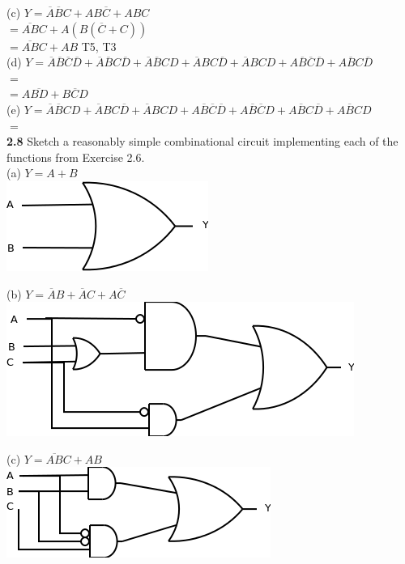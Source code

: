 \documentclass[12pt,a4paper]{report}
\newcommand*{\al}{\overline{A}}
\newcommand*{\cl}{\overline{C}}
\begin{document}
\begin{normalsize}
(c) $ Y = \overline{A}\overline{B}C + AB\overline{C} + ABC $ \\
$ = \overline{AB}C + A(B(\cl{}+C)) $ \\ 
$ = \overline{AB}C + AB $ T5, T3 \\

(d) $ Y = \overline{A}\overline{B}\overline{C}\overline{D} + \overline{A}\overline{B}C\overline{D} + \overline{A}\overline{B}CD + \overline{A}BC\overline{D} + \overline{A}BCD + A\overline{B}\overline{C}\overline{D} + A\overline{B}C\overline{D} $ \\
$ = $ \\

$ = A\overline{BD} + \overline{BCD} $ \\

(e) $ Y = \overline{A}\overline{B}CD + \overline{A}BC\overline{D} + \overline{A}BCD + A\overline{B}\overline{C}\overline{D} + A\overline{B}\overline{C}D + A\overline{B}C\overline{D} + A\overline{B}CD $ \\
$ = $ \\


\textbf{2.8} Sketch a reasonably simple combinational circuit implementing each of the functions from Exercise 2.6. \\
(a) $ Y = A + B $ \\
\includegraphics[scale=1]{2_8A}

(b) $ Y = \al{}B + \al{}C + A\cl{} $ \\
\includegraphics[scale=1]{2_8B}

(c) $ Y = \overline{AB}C + AB $ \\
\includegraphics[scale=1]{2_8C}


\end{normalsize}
\end{document}
